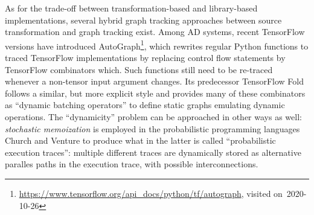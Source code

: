 As for the trade-off between transformation-based and library-based implementations, several hybrid
graph tracking approaches between source transformation and graph tracking exist.  Among AD systems,
recent TensorFlow versions have introduced
AutoGraph\footnote{\url{https://www.tensorflow.org/api_docs/python/tf/autograph}, visited
  on~2020-10-26}, which rewrites regular Python functions to traced TensorFlow implementations by
replacing control flow statements by TensorFlow combinators which.  Such functions still need to be
re-traced whenever a non-tensor input argument changes.  Its predecessor TensorFlow Fold
\parencite{looks2017deep} follows a similar, but more explicit style and provides many of these
combinators as \enquote{dynamic batching operators} to define static graphs emulating dynamic
operations.  The \enquote{dynamicity} problem can be approached in other ways as well:
\emph{stochastic memoization} is employed in the probabilistic programming languages Church
\parencite{goodman2012church} and Venture \parencite{mansinghka2014venture} to produce what in the
latter is called \enquote{probabilistic execution traces}: multiple different traces are dynamically
stored as alternative paralles paths in the execution trace, with possible interconnections.

